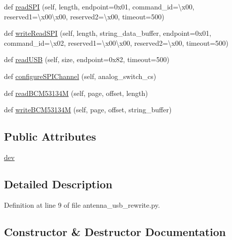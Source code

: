 \begin{DoxyCompactItemize}
\item 
def \hyperlink{classantenna__usb__rewrite_1_1_cp2130_aa96193d3a9931aacb9f5061ab5ee792f}{read\+S\+PI} (self, length, endpoint=0x01, command\+\_\+id=\textquotesingle{}\textbackslash{}x00\textquotesingle{}, reserved1=\textquotesingle{}\textbackslash{}x00\textbackslash{}x00\textquotesingle{}, reserved2=\textquotesingle{}\textbackslash{}x00\textquotesingle{}, timeout=500)
\item 
def \hyperlink{classantenna__usb__rewrite_1_1_cp2130_a8237d344945d80984898042fe61828bd}{write\+Read\+S\+PI} (self, length, string\+\_\+data\+\_\+buffer, endpoint=0x01, command\+\_\+id=\textquotesingle{}\textbackslash{}x02\textquotesingle{}, reserved1=\textquotesingle{}\textbackslash{}x00\textbackslash{}x00\textquotesingle{}, reserved2=\textquotesingle{}\textbackslash{}x00\textquotesingle{}, timeout=500)
\item 
def \hyperlink{classantenna__usb__rewrite_1_1_cp2130_a44063c256f8a9e81ab4c3a1e638f9c79}{read\+U\+SB} (self, size, endpoint=0x82, timeout=500)
\item 
def \hyperlink{classantenna__usb__rewrite_1_1_cp2130_ad05ed18628162c64fc32dadd09cb4419}{configure\+S\+P\+I\+Channel} (self, analog\+\_\+switch\+\_\+cs)
\item 
def \hyperlink{classantenna__usb__rewrite_1_1_cp2130_aed58256031219fe4f9079616d168a6fb}{read\+B\+C\+M53134M} (self, page, offset, length)
\item 
def \hyperlink{classantenna__usb__rewrite_1_1_cp2130_a5d3c0c50d0e378c6feb1dbf61d914a47}{write\+B\+C\+M53134M} (self, page, offset, string\+\_\+buffer)
\end{DoxyCompactItemize}
\subsection*{Public Attributes}
\begin{DoxyCompactItemize}
\item 
\hyperlink{classantenna__usb__rewrite_1_1_cp2130_a1df7fb45632de5416e76230b2decab8c}{dev}
\end{DoxyCompactItemize}


\subsection{Detailed Description}


Definition at line 9 of file antenna\+\_\+usb\+\_\+rewrite.\+py.



\subsection{Constructor \& Destructor Documentation}
